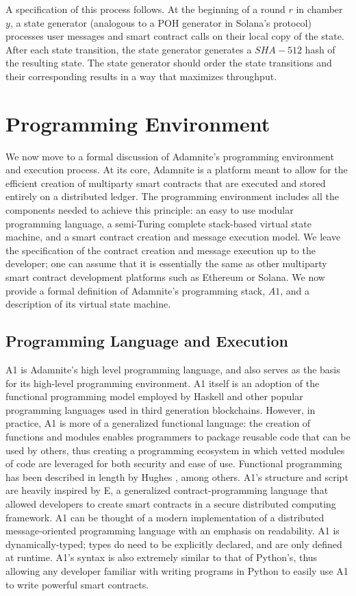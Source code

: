 \documentclass[conference]{IEEEtran}
\begin{document}
A specification of this process follows. At the beginning of a round $r$ in chamber $y$, a state generator (analogous to a POH generator in Solana's protocol) processes user messages and smart contract calls on their local copy of the state. After each state transition, the state generator generates a $SHA-512$ hash of the resulting state. The state generator should order the state transitions and their corresponding results in a way that maximizes throughput. 





\section{Programming Environment}

We now move to a formal discussion of Adamnite's programming environment and execution process. At its core, Adamnite is a platform meant to allow for the efficient creation of multiparty smart contracts that are executed and stored entirely on a distributed ledger. The programming environment includes all the components needed to achieve this principle: an easy to use modular programming language, a semi-Turing complete stack-based virtual state machine, and a smart contract creation and message execution model. We leave the specification of the contract creation and message execution up to the developer; one can assume that it is essentially the same as other multiparty smart contract development platforms such as Ethereum or Solana. We now provide a formal definition of Adamnite's programming stack, $A1$, and a description of its virtual state machine. 

\subsection{Programming Language and Execution}
A1 is Adamnite's high level programming language, and also serves as the basis for its high-level programming environment. A1 itself is an adoption of the functional programming model employed by Haskell and other popular programming languages used in third generation blockchains. However, in practice, A1 is more of a generalized functional language: the creation of functions and modules enables programmers to package reusable code that can be used by others, thus creating a programming ecosystem in which vetted modules of code are leveraged for both security and ease of use. Functional programming has been described in length by Hughes \cite{hughesFunctional}, among others. A1's structure and script are heavily inspired by E, a generalized contract-programming language that allowed developers to create smart contracts in a secure distributed computing framework. A1 can be thought of a modern implementation of a distributed message-oriented programming language with an emphasis on readability. A1 is dynamically-typed; types do need to be explicitly declared, and are only defined at runtime. A1's syntax is also extremely similar to that of Python's, thus allowing any developer familiar with writing programs in Python to easily use A1 to write powerful smart contracts.  \\
\end{document}

